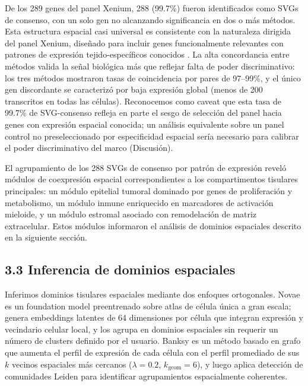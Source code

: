 \documentclass[12pt,a4paper]{article}
\begin{document}
De los 289 genes del panel Xenium, 288 (99.7\%) fueron identificados como SVGs de consenso, con un solo gen no alcanzando significancia en dos o más métodos. Esta estructura espacial casi universal es consistente con la naturaleza dirigida del panel Xenium, diseñado para incluir genes funcionalmente relevantes con patrones de expresión tejido-específicos conocidos \citep{janesick2023high}. La alta concordancia entre métodos valida la señal biológica más que reflejar falta de poder discriminativo: los tres métodos mostraron tasas de coincidencia por pares de 97--99\%, y el único gen discordante se caracterizó por baja expresión global (menos de 200 transcritos en todas las células). Reconocemos como caveat que esta tasa de 99.7\% de SVG-consenso refleja en parte el sesgo de selección del panel hacia genes con expresión espacial conocida; un análisis equivalente sobre un panel control no preseleccionado por especificidad espacial sería necesario para calibrar el poder discriminativo del marco (Discusión).

El agrupamiento de los 288 SVGs de consenso por patrón de expresión reveló módulos de coexpresión espacial correspondientes a los compartimentos tisulares principales: un módulo epitelial tumoral dominado por genes de proliferación y metabolismo, un módulo inmune enriquecido en marcadores de activación mieloide, y un módulo estromal asociado con remodelación de matriz extracelular. Estos módulos informaron el análisis de dominios espaciales descrito en la siguiente sección.

\subsection*{3.3 Inferencia de dominios espaciales}
Inferimos dominios tisulares espaciales mediante dos enfoques ortogonales. Novae \citep{schaar2025novae} es un foundation model preentrenado sobre atlas de célula única a gran escala; genera embeddings latentes de 64 dimensiones por célula que integran expresión y vecindario celular local, y los agrupa en dominios espaciales sin requerir un número de clusters definido por el usuario. Banksy \citep{zhao2023banksy} es un método basado en grafo que aumenta el perfil de expresión de cada célula con el perfil promediado de sus $k$ vecinos espaciales más cercanos ($\lambda = 0.2$, $k_{\text{geom}} = 6$), y luego aplica detección de comunidades Leiden para identificar agrupamientos espacialmente coherentes.
\end{document}
